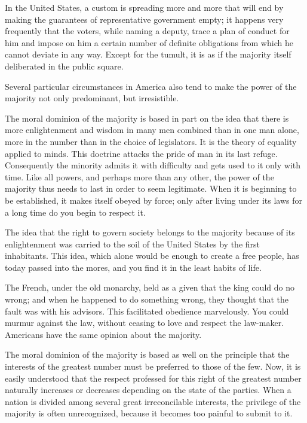 In the United States, a custom is spreading more and more that will end by making the guarantees of representative government empty; it happens very frequently that the voters, while naming a deputy, trace a plan of conduct for him and impose on him a certain number of definite obligations from which he cannot deviate in any way. Except for the tumult, it is as if the majority itself deliberated in the public square.

Several particular circumstances in America also tend to make the power of the majority not only predominant, but irresistible.

The moral dominion of the majority is based in part on the idea that there is more enlightenment and wisdom in many men combined than in one man alone, more in the number than in the choice of legislators. It is the theory of equality applied to minds. This doctrine attacks the pride of man in its last refuge. Consequently the minority admits it with difficulty and gets used to it only with time. Like all powers, and perhaps more than any other, the power of the majority thus needs to last in order to seem legitimate. When it is beginning to be established, it makes itself obeyed by force; only after living under its laws for a long time do you begin to respect it.

The idea that the right to govern society belongs to the majority because of its enlightenment was carried to the soil of the United States by the first inhabitants. This idea, which alone would be enough to create a free people, has today passed into the mores, and you find it in the least habits of life.

The French, under the old monarchy, held as a given that the king could do no wrong; and when he happened to do something wrong, they thought that the fault was with his advisors. This facilitated obedience marvelously. You could murmur against the law, without ceasing to love and respect the law-maker. Americans have the same opinion about the majority.

The moral dominion of the majority is based as well on the principle that the interests of the greatest number must be preferred to those of the few. Now, it is easily understood that the respect professed for this right of the greatest number naturally increases or decreases depending on the state of the parties. When a nation is divided among several great irreconcilable interests, the privilege of the majority is often unrecognized, because it becomes too painful to submit to it.

